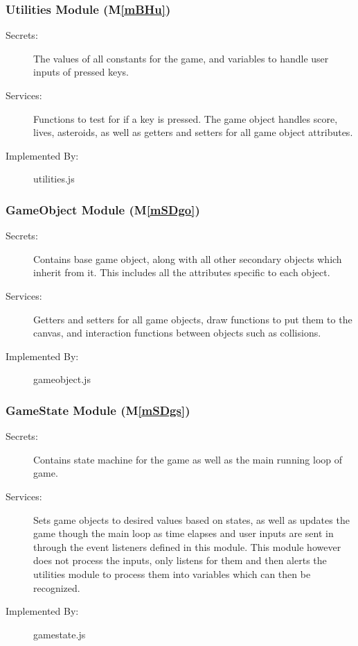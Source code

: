 \documentclass[12pt, titlepage]{article}
\newcommand{\mref}[1]{M\ref{#1}}
\begin{document}
\subsubsection{Utilities Module (\mref{mBHu})}
\begin{description}
\item[Secrets:]The values of all constants for the game, and variables to handle user inputs of pressed keys.
\item[Services:] Functions to test for if a key is pressed. The game object handles score, lives, asteroids, as well as getters and setters for all game object attributes.
\item[Implemented By:] utilities.js
\end{description}

\subsubsection{GameObject Module (\mref{mSDgo})}
\begin{description}
\item[Secrets:] Contains base game object, along with all other secondary objects which inherit from it. This includes all the attributes specific to each object.
\item[Services:] Getters and setters for all game objects, draw functions to put them to the canvas, and interaction functions between objects such as collisions.
\item[Implemented By:] gameobject.js
\end{description}

\subsubsection{GameState Module (\mref{mSDgs})}
\begin{description}
\item[Secrets:] Contains state machine for the game as well as the main running loop of game.
\item[Services:] Sets game objects to desired values based on states, as well as updates the game though the main loop as time elapses and user inputs are sent in through the event listeners defined in this module. This module however does not process the inputs, only listens for them and then alerts the utilities module to process them into variables which can then be recognized.
\item[Implemented By:] gamestate.js
\end{description}
\end{document}
